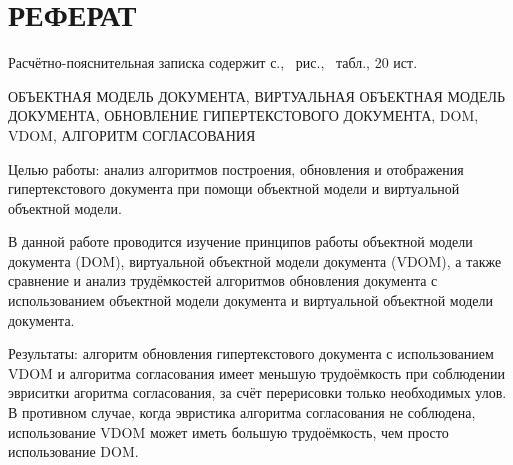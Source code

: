 \section*{РЕФЕРАТ}

Расчётно-пояснительная записка содержит \pageref{LastPage} с., \totalfigures\ рис., \totaltables\ табл., 20 ист.

ОБЪЕКТНАЯ МОДЕЛЬ ДОКУМЕНТА, ВИРТУАЛЬНАЯ ОБЪЕКТНАЯ МОДЕЛЬ ДОКУМЕНТА, ОБНОВЛЕНИЕ ГИПЕРТЕКСТОВОГО ДОКУМЕНТА, DOM, VDOM, АЛГОРИТМ СОГЛАСОВАНИЯ

Целью работы: анализ алгоритмов построения, обновления и отображения гипертекстового документа при помощи объектной модели и виртуальной объектной модели.

В данной работе проводится изучение принципов работы объектной модели документа (DOM), виртуальной объектной модели документа (VDOM), а также сравнение и анализ трудёмкостей алгоритмов обновления документа с использованием объектной модели документа и виртуальной объектной модели документа.

Результаты: алгоритм обновления гипертекстового документа с использованием VDOM и алгоритма согласования имеет меньшую трудоёмкость при соблюдении эвриситки агоритма согласования, за счёт перерисовки только необходимых улов.
В противном случае, когда эвристика алгоритма согласования не соблюдена, использование VDOM может иметь большую трудоёмкость, чем просто использование DOM.


\pagebreak